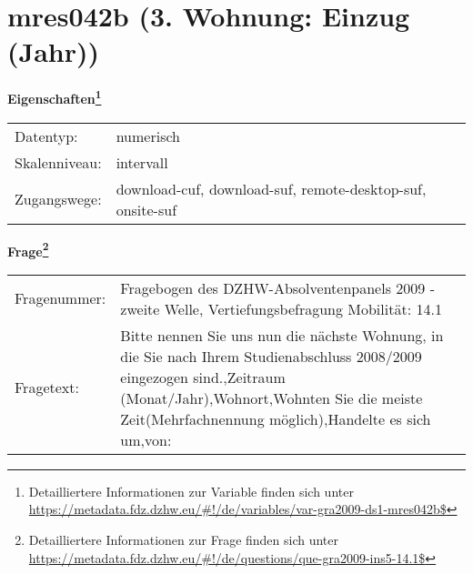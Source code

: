 
    \setcounter{footnote}{0}

    \vspace*{-1.8cm}
	\section{mres042b (3. Wohnung: Einzug (Jahr))}
	\label{section:mres042b}



    \vspace*{0.5cm}
    \noindent\textbf{Eigenschaften\footnote{Detailliertere Informationen zur Variable finden sich unter
		\url{https://metadata.fdz.dzhw.eu/\#!/de/variables/var-gra2009-ds1-mres042b$}}}\\
	\begin{tabularx}{\hsize}{@{}lX}
	Datentyp: & numerisch \\
	Skalenniveau: & intervall \\
	Zugangswege: &
	  download-cuf, 
	  download-suf, 
	  remote-desktop-suf, 
	  onsite-suf
 \\
    \end{tabularx}



				\vspace*{0.5cm}
                \noindent\textbf{Frage\footnote{Detailliertere Informationen zur Frage finden sich unter
		              \url{https://metadata.fdz.dzhw.eu/\#!/de/questions/que-gra2009-ins5-14.1$}}}\\
				\begin{tabularx}{\hsize}{@{}lX}
					Fragenummer: &
					  Fragebogen des DZHW-Absolventenpanels 2009 - zweite Welle, Vertiefungsbefragung Mobilität:
					  14.1
 \\
					Fragetext: & Bitte nennen Sie uns nun die nächste Wohnung, in die Sie nach Ihrem Studienabschluss 2008/2009 eingezogen sind.,Zeitraum (Monat/Jahr),Wohnort,Wohnten Sie die meiste Zeit(Mehrfachnennung möglich),Handelte es sich um,von: \\
				\end{tabularx}





